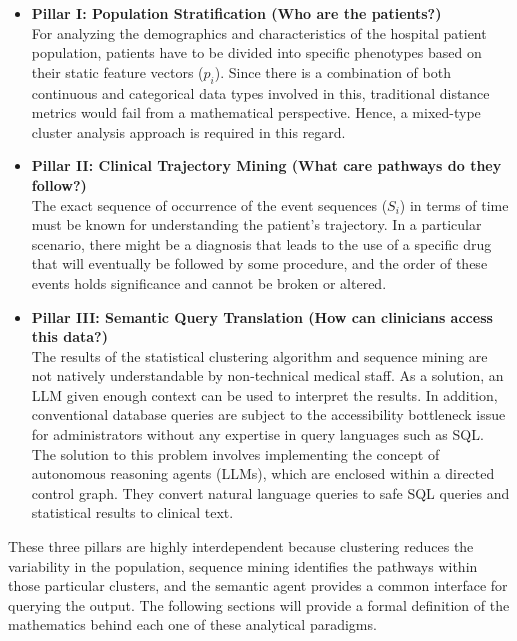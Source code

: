 \begin{itemize}
    \item \textbf{Pillar I: Population Stratification (Who are the patients?)} \\
    For analyzing the demographics and characteristics of the hospital patient population, patients have to be divided into specific phenotypes based on their static feature vectors ($p_i$). Since there is a combination of both continuous and categorical data types involved in this, traditional distance metrics would fail from a mathematical perspective. Hence, a mixed-type cluster analysis approach is required in this regard.

    \vspace{0.5em}

    \item \textbf{Pillar II: Clinical Trajectory Mining (What care pathways do they follow?)} \\
    The exact sequence of occurrence of the event sequences ($S_i$) in terms of time must be known for understanding the patient's trajectory. In a particular scenario, there might be a diagnosis that leads to the use of a specific drug that will eventually be followed by some procedure, and the order of these events holds significance and cannot be broken or altered.

    \vspace{0.5em}

    \item \textbf{Pillar III: Semantic Query Translation (How can clinicians access this data?)} \\
    The results of the statistical clustering algorithm and sequence mining are not natively understandable by non-technical medical staff. As a solution, an LLM given enough context can be used to interpret the results. In addition, conventional database queries are subject to the accessibility bottleneck issue for administrators without any expertise in query languages such as SQL. The solution to this problem involves implementing the concept of autonomous reasoning agents (LLMs), which are enclosed within a directed control graph. They convert natural language queries to safe SQL queries and statistical results to clinical text.
\end{itemize}

\vspace{1em}

These three pillars are highly interdependent because clustering reduces the variability in the population, sequence mining identifies the pathways within those particular clusters, and the semantic agent provides a common interface for querying the output. The following sections will provide a formal definition of the mathematics behind each one of these analytical paradigms.
